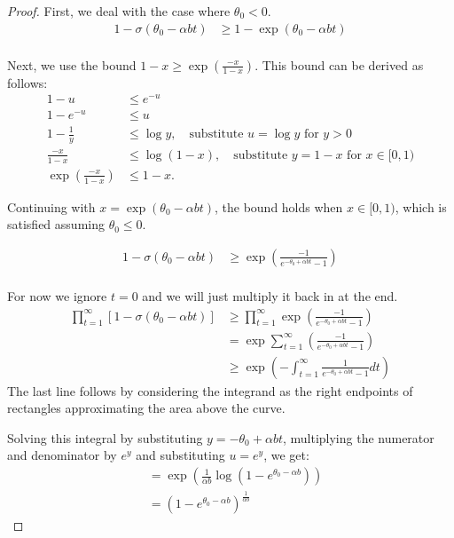 \begin{proof}
First, we deal with the case where $\theta_0 < 0$.
\begin{align*}
    1 - \sigma(\theta_0 - \alpha b t) &\ge 1 - \exp (\theta_0 - \alpha b t) \\
\end{align*}

Next, we use the bound $1-x \ge \exp (\frac{-x}{1-x} )$.
This bound can be derived as follows:
\begin{align*}
1 - u &\le e^{-u} \\ 
1 - e^{-u} &\le u \\
1 - \frac{1}{y} &\le \log y, \quad \text{substitute } u = \log y \text { for } y > 0 \\
\frac{-x}{1-x} &\le \log (1-x), \quad \text{substitute } y = 1-x \text{ for } x \in [0, 1) \\
\exp \left( \frac{-x}{1-x} \right) & \le 1 - x.
\end{align*}

Continuing with $x = \exp(\theta_0 - \alpha b t)$, the bound holds when $x \in [0,1)$, which is satisfied assuming $\theta_0 \le 0$.

\begin{align*}
    1 - \sigma(\theta_0 - \alpha b t) &\ge \exp \left(\frac{-1}{e^{-\theta_0 + \alpha b t} - 1} \right)\\
\end{align*}

For now we ignore $t=0$ and we will just multiply it back in at the end.
\begin{align*}
    \prod_{t=1}^\infty [1 - \sigma(\theta_0 - \alpha b t)] &\ge \prod_{t=1}^\infty \exp \left(\frac{-1}{e^{-\theta_0 + \alpha b t} - 1} \right) \\
    &=  \exp \sum_{t=1}^\infty \left(\frac{-1}{e^{-\theta_0 + \alpha b t} - 1} \right) \\
    &\ge \exp \left( - \int_{t=1}^\infty \frac{1}{e^{-\theta_0 + \alpha b t} - 1} dt \right)
\end{align*}
The last line follows by considering the integrand as the right endpoints of rectangles approximating the area above the curve.

Solving this integral by substituting $y = -\theta_0 + \alpha b t$, multiplying the numerator and denominator by $e^y$ and substituting $u = e^y$, we get:
\begin{align*}
    &= \exp \left( \frac{1}{\alpha b} \log (1 - e^{\theta_0-\alpha b}) \right) \\ 
    &= \left(1- e^{\theta_0 -\alpha b} \right)^{\frac{1}{\alpha b}} 
\end{align*}


\end{proof}
